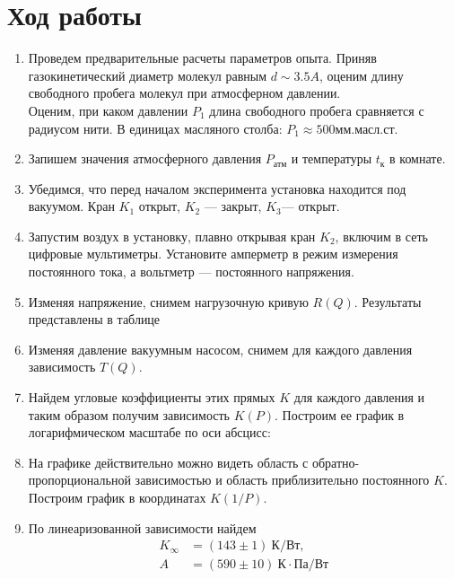 \documentclass[12pt]{article}
\begin{document}
    \section{Ход работы}
        \begin{enumerate}
            \item Проведем предварительные расчеты параметров опыта. Приняв газокинетический диаметр молекул равным $d \sim 3.5 A$, оценим
            длину свободного пробега молекул при атмосферном давлении.\\
            Оценим, при каком давлении $P_1$ длина свободного пробега сравняется с радиусом нити. В единицах масляного столба: $P_1 \approx 500 \text{мм.масл.ст.}$
            \item Запишем значения атмосферного давления $P_{\text{атм}}$ и температуры $t_{\text{к}}$ в комнате.
            \item Убедимся, что перед началом эксперимента установка находится под вакуумом. Кран $K_1$ открыт, $K_2$ — закрыт, $K_3$— открыт.
            \item Запустим воздух в установку, плавно открывая кран $K_2$, включим в сеть цифровые мультиметры. Установите амперметр в режим
            измерения постоянного тока, а вольтметр — постоянного напряжения.
            \item Изменяя напряжение, снимем нагрузочную кривую $R(Q)$. Результаты представлены в
            таблице

            \item Изменяя давление вакуумным насосом, снимем для каждого давления
            зависимость $T(Q)$.

            \item Найдем угловые коэффициенты этих прямых $K$ для каждого давления
            и таким образом получим зависимость $K(P)$. Построим ее график в логарифмическом масштабе
            по оси абсцисс:

            \item На графике действительно можно видеть область с обратно-пропорциональной зависимостью и
            область приблизительно постоянного $K$. Построим график в координатах $K(1/P)$.

            \item По линеаризованной зависимости найдем
            \begin{align*}
            K_{\infty} & = (143\pm 1)\ \text{К}/\text{Вт},\\
            A & = (590\pm 10)\ \text{К}\cdot \text{Па}/\text{Вт}
            \end{align*}


\end{enumerate}
\end{document}
